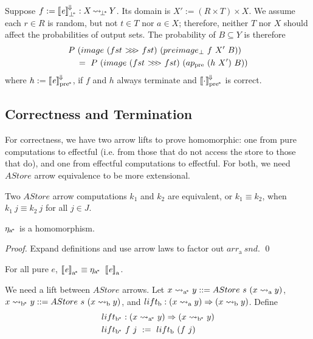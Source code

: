 \documentclass{llncs}
\newcommand{\arrow}{\rightsquigarrow}
\newcommand{\conv}{^{\mspace{-2mu}\Downarrow\mspace{-2mu}}}
\newcommand{\meaningofconv}[1]{\left\llbracket{#1}\right\rrbracket\conv}
\newcommand{\arrowlift}{\ensuremath{lift}}
\newcommand{\arrowarr}{\ensuremath{arr}}
\newcommand{\arrowcomp}{\ensuremath{{>}\mspace{-6mu}{>}\mspace{-6mu}{>}}}
\newcommand{\arrowtrans}{\ensuremath{\eta}}
\newcommand{\gen}{_\mathrm{a}}
\newcommand{\genb}{_\mathrm{b}}
\newcommand{\genc}{_\mathrm{a^{\mspace{-2mu}*}}}
\newcommand{\gend}{_\mathrm{b^{\mspace{-2mu}*}}}
\newcommand{\pre}{_\mathrm{pre}}
\newcommand{\pbot}{{\bot^{\mspace{-4mu}*}}}
\DeclareMathOperator{\pbotto}{\arrow_{\mspace{-3mu}\pbot}}
\newcommand{\ppre}{_\mathrm{pre^{\mspace{-2mu}*}}}
\begin{document}
Suppose $f := \meaningofconv{\mathit{e}}_\pbot : X \pbotto Y$.
Its domain is $X' := (R \times T) \times X$.
We assume each $r \in R$ is random, but not $t \in T$ nor $a \in X$; therefore, neither $T$ nor $X$ should affect the probabilities of output sets.
The probability of $B \subseteq Y$ is therefore
\begin{equation}
\begin{aligned}
	&P~(image~(fst~\arrowcomp~fst)~(preimage_\bot~f~X'~B)) \\
	&\tab =\ P~(image~(fst~\arrowcomp~fst)~(ap\pre~(h~X')~B))
\end{aligned}
\end{equation}
where $h := \meaningofconv{\mathit{e}}\ppre$, if $f$ and $h$ always terminate and $\meaningofconv{\cdot}\ppre$ is correct.

\subsection{Correctness and Termination}

For correctness, we have two arrow lifts to prove homomorphic: one from pure computations to effectful (i.e. from those that do not access the store to those that do), and one from effectful computations to effectful.
For both, we need $AStore$ arrow equivalence to be more extensional.

\begin{definition}
Two $AStore$ arrow computations $k_1$ and $k_2$ are equivalent, or $k_1 \equiv k_2$, when $k_1~j \equiv k_2~j$ for all $j \in J$.
\end{definition}

\begin{theorem}
$\arrowtrans\genc$ is a homomorphism.
\end{theorem}
\begin{proof}
Expand definitions and use arrow laws to factor out $\arrowarr\gen~snd$.
\qed
\end{proof}

\begin{corollary}
\label{cor:pure-astore-semantic-correctness}
For all pure $\mathit{e}$, $\meaningof{\mathit{e}}\genc \equiv \arrowtrans\genc~\meaningof{\mathit{e}}\gen$.
\end{corollary}

We need a lift between $AStore$ arrows.
Let $x \arrow\genc y ::= AStore~s~(x \arrow\gen y)$, $x \arrow\gend y ::= AStore~s~(x \arrow\genb y)$, and $\arrowlift\genb : (x \arrow\gen y) \tto (x \arrow\genb y)$.
Define
\begin{equation}
\begin{aligned}
	&\arrowlift\gend : (x \arrow\genc y) \tto (x \arrow\gend y) \\
	&\arrowlift\gend~f~j \ := \ \arrowlift\genb~(f~j)
\end{aligned}
\end{equation}
\end{document}
